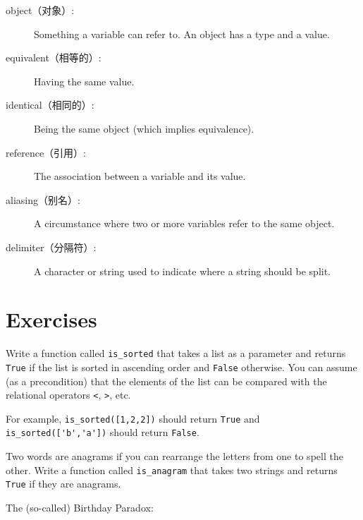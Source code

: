 \documentclass[10pt]{book}
\begin{document}
\begin{CJK}{UTF8}{gbsn}
\begin{description}
\item[object（对象）:] Something a variable can refer to.  An object
has a type and a value.

\item[equivalent（相等的）:] Having the same value.

\item[identical（相同的）:] Being the same object (which implies equivalence).

\item[reference（引用）:] The association between a variable and its value.

\item[aliasing（别名）:] A circumstance where two or more variables refer to the same
object.

\item[delimiter（分隔符）:] A character or string used to indicate where a
string should be split.

\end{description}


\section{Exercises}

\begin{exercise}
Write a function called \verb"is_sorted" that takes a list as a
parameter and returns {\tt True} if the list is sorted in ascending
order and {\tt False} otherwise.  You can assume (as a precondition)
that the elements of the list can be compared with the relational
operators {\tt <}, {\tt >}, etc.

For example, \verb"is_sorted([1,2,2])" should return {\tt True}
and \verb"is_sorted(['b','a'])" should return {\tt False}.
\end{exercise}


\begin{exercise}
\label{anagram}

Two words are anagrams if you can rearrange the letters from one
to spell the other.  Write a function called \verb"is_anagram"
that takes two strings and returns {\tt True} if they are anagrams.
\end{exercise}


\begin{exercise}
\label{duplicate}

The (so-called) Birthday Paradox:


\end{exercise}
\end{CJK}
\end{document}
